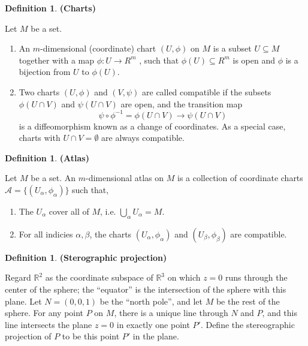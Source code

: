 \documentclass{article}
\theoremstyle{definition}
\newtheorem{defn}[theorem]{Definition}
\newenvironment{definition}
  {\vspace{8pt}\begin{mdframed}[backgroundcolor=blueish,innertopmargin=4]\begin{defn}}
  {\end{defn}\end{mdframed}\vspace{4pt}}
\begin{document}
\begin{definition} \textbf{(Charts)}

Let $M$ be a set.
\begin{enumerate}
    \item An $m$-dimensional (coordinate) chart $(U,\phi)$ on $M$ is a subset $U \subseteq M$ together with a map $\phi : U \rightarrow R^m$ , such that $\phi(U) \subseteq R^m$ is open and $\phi$ is a bijection from $U$ to $\phi(U)$.
    
    \item  Two charts $(U,\phi)$ and $(V,\psi)$ are called compatible if the subsets $\phi(U \cap V)$ and $\psi(U \cap V)$ are open, and the transition map
    \[
        \psi \circ \phi^{-1}  = \phi(U \cap V) \rightarrow \psi(U \cap V)
    \]
    is a diffeomorphism known as a change of coordinates. As a special case, charts with $U\cap V = \emptyset $ are always compatible.
\end{enumerate}
\end{definition}

\begin{definition} \textbf{(Atlas)}

Let $M$ be a set. An $m$-dimensional atlas on $M$ is a collection of coordinate charts $\mathscr{A} =  \{(U_\alpha, \phi_\alpha) \}$ such that,
\begin{enumerate}
    \item The $U_\alpha$ cover all of $M$, i.e. $\bigcup_\alpha U_\alpha = M$.
    \item For all indicies $\alpha, \beta$, the charts $(U_\alpha, \phi_\alpha)$ and $(U_\beta, \phi_\beta)$ are compatible.
\end{enumerate}

\end{definition}

\begin{definition} \textbf{(Sterographic projection)}

Regard $\mathbb R^2$ as the coordinate subspace of $\mathbb R^3$ on which $z = 0$ runs through the center of the sphere; the ``equator'' is the intersection of the sphere with this plane.
Let $N = (0, 0, 1)$ be the ``north pole'', and let $M$ be the rest of the sphere. For any point $P$ on $M$, there is a unique line through $N$ and $P$, and this line intersects the plane $z = 0$ in exactly one point $P'$. Define the stereographic projection of $P$ to be this point $P'$ in the plane. 
\end{definition}
\end{document}
